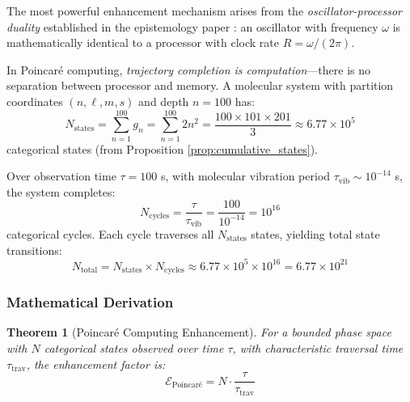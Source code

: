 \documentclass[twocolumn,10pt]{article}
\newtheorem{theorem}{Theorem}[section]
\theoremstyle{remark}
\begin{document}
The most powerful enhancement mechanism arises from the \textit{oscillator-processor duality} established in the epistemology paper \cite{sachikonye2025epistemology}: an oscillator with frequency $\omega$ is mathematically identical to a processor with clock rate $R = \omega/(2\pi)$.

In Poincaré computing, \textit{trajectory completion is computation}—there is no separation between processor and memory. A molecular system with partition coordinates $(n, \ell, m, s)$ and depth $n = 100$ has:
\begin{equation}
    N_{\text{states}} = \sum_{n=1}^{100} g_n = \sum_{n=1}^{100} 2n^2 = \frac{100 \times 101 \times 201}{3} \approx 6.77 \times 10^5
    \label{eq:poincare_state_count}
\end{equation}
categorical states (from Proposition \ref{prop:cumulative_states}).

Over observation time $\tau = 100$ s, with molecular vibration period $\tau_{\text{vib}} \sim 10^{-14}$ s, the system completes:
\begin{equation}
    N_{\text{cycles}} = \frac{\tau}{\tau_{\text{vib}}} = \frac{100}{10^{-14}} = 10^{16}
    \label{eq:poincare_cycles}
\end{equation}
categorical cycles. Each cycle traverses all $N_{\text{states}}$ states, yielding total state transitions:
\begin{equation}
    N_{\text{total}} = N_{\text{states}} \times N_{\text{cycles}} \approx 6.77 \times 10^5 \times 10^{16} = 6.77 \times 10^{21}
    \label{eq:poincare_total_transitions}
\end{equation}

\subsubsection{Mathematical Derivation}

\begin{theorem}[Poincaré Computing Enhancement]
\label{thm:poincare_enhancement}
For a bounded phase space with $N$ categorical states observed over time $\tau$, with characteristic traversal time $\tau_{\text{trav}}$, the enhancement factor is:
\begin{equation}
    \mathcal{E}_{\text{Poincaré}} = N \cdot \frac{\tau}{\tau_{\text{trav}}}
    \label{eq:poincare_enhancement}
\end{equation}
\end{theorem}
\end{document}
